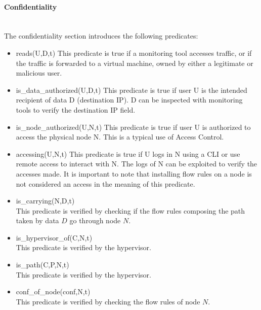 \paragraph{Confidentiality}\textbf{\\}
The confidentiality section introduces the following predicates:
\begin{itemize}
\item reads(U,D,t)
\newline
This predicate is true if a monitoring tool accesses traffic,  or if the traffic is forwarded to a virtual machine, owned by either a legitimate or malicious user.

\item is\_data\_authorized(U,D,t)
\newline
This predicate is true if user U is the intended recipient of data D (\eg destination IP).
D can be inspected with monitoring tools to verify the destination IP field.
\item is\_node\_authorized(U,N,t)
\newline
This predicate is true if user U is authorized to access the physical node N.
This is a typical use of Access Control.
\item accessing(U,N,t)
\newline
This predicate is true if U logs in N using a CLI or use remote access to interact with N.
The logs of N can be exploited to verify the accesses made.
It is important to note that installing flow rules on a node is not considered an access in the meaning of this predicate.

\item is\_carrying(N,D,t)\\
This predicate is verified by checking if the flow rules composing the path taken by data $D$ go through node $N$.

\item is\_hypervisor\_of(C,N,t)\\
This predicate is verified by the hypervisor.

\item is\_path(C,P,N,t)\\
This predicate  is verified by the hypervisor.

\item conf\_of\_node(conf,N,t)\\
This predicate  is verified by checking the flow rules of node $N$.

\end{itemize}

